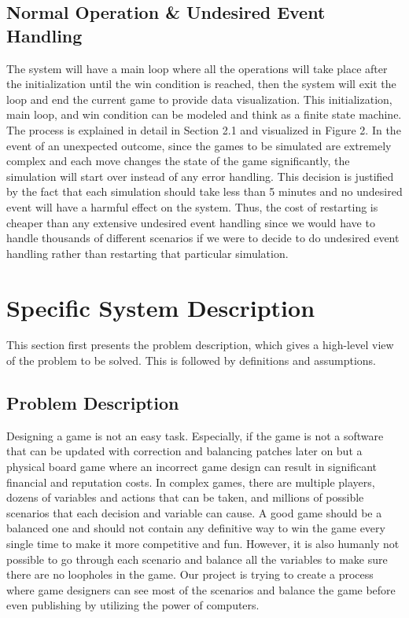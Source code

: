 \documentclass[12pt]{article}
\begin{document}
\subsection{Normal Operation \& Undesired Event Handling}
The system will have a main loop where all the operations will take place after the initialization until the win condition is reached, then the system will exit the loop and end the current game to provide data visualization. This initialization, main loop, and win condition can be modeled and think as a finite state machine. The process is explained in detail in Section 2.1 and visualized in Figure 2. In the event of an unexpected outcome, since the games to be simulated are extremely complex and each move changes the state of the game significantly, the simulation will start over instead of any error handling. This decision is justified by the fact that each simulation should take less than 5 minutes and no undesired event will have a harmful effect on the system. Thus, the cost of restarting is cheaper than any extensive undesired event handling since we would have to handle thousands of different scenarios if we were to decide to do undesired event handling rather than restarting that particular simulation.

\newpage
\section{Specific System Description}

This section first presents the problem description, which gives a high-level
view of the problem to be solved.  This is followed by definitions and assumptions.

\subsection{Problem Description} \label{Sec_pd}

Designing a game is not an easy task. Especially, if the game is not a software that can be updated with correction and balancing patches later on but a physical board game where an incorrect game design can result in significant financial and reputation costs. In complex games, there are multiple players, dozens of variables and actions that can be taken, and millions of possible scenarios that each decision and variable can cause. A good game should be a balanced one and should not contain any definitive way to win the game every single time to make it more competitive and fun. However, it is also humanly not possible to go through each scenario and balance all the variables to make sure there are no loopholes in the game. Our project is trying to create a process where game designers can see most of the scenarios and balance the game before even publishing by utilizing the power of computers.
\end{document}
